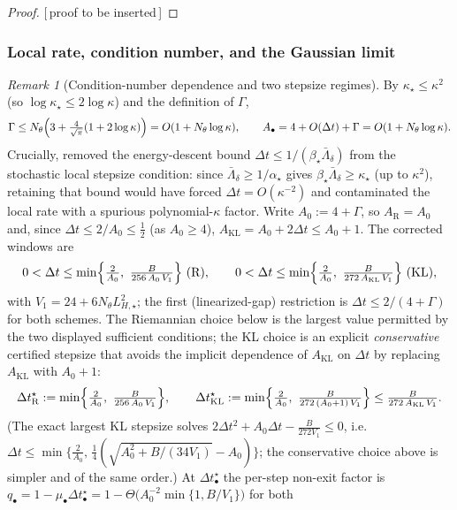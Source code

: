 \documentclass[11pt]{article}
\theoremstyle{plain}
\theoremstyle{definition}
\theoremstyle{remark}
\newtheorem{remark}[remark]{Remark}
\newcommand{\KL}{\mathrm{KL}}
\newcommand{\Riem}{\mathrm{R}}
\newcommand{\LHs}{L_{H,\star}}
\newcommand{\PROOFHOLE}{{\color{red}\textsf{[\,proof to be inserted\,]}}}
\begin{document}
\begin{proof}
\PROOFHOLE
\end{proof}

\subsubsection{Local rate, condition number, and the Gaussian limit}
\label{subsec:local-condnum}

\begin{remark}[Condition-number dependence and two stepsize regimes]
\label{rem:local-condnum}
By $\kappa_\star\leq\kappa^2$ (so $\log\kappa_\star\leq2\log\kappa$) and the definition of $\Gamma$,
\[
    \Gamma\leq N_\theta\Bigl(3+\tfrac4{\sqrt\pi}(1+2\log\kappa)\Bigr)=O(1+N_\theta\log\kappa),
    \qquad A_\bullet=4+O(\Delta t)+\Gamma=O(1+N_\theta\log\kappa).
\]
Crucially,  removed the energy-descent bound
$\Delta t\leq1/(\beta_\star\bar\Lambda_\delta)$ from the stochastic local stepsize condition: since
$\bar\Lambda_\delta\geq1/\alpha_\star$ gives $\beta_\star\bar\Lambda_\delta\geq\kappa_\star$ (up to
$\kappa^2$), retaining that bound would have forced $\Delta t=O(\kappa^{-2})$ and contaminated the
local rate with a spurious polynomial-$\kappa$ factor. Write $A_0:=4+\Gamma$, so $A_{\Riem}=A_0$ and,
since $\Delta t\leq2/A_0\leq\tfrac12$ (as $A_0\geq4$), $A_{\KL}=A_0+2\Delta t\leq A_0+1$. The corrected
windows are
\[
    0<\Delta t\leq\min\Bigl\{\tfrac2{A_0},\ \tfrac{B}{256\,A_0\,V_1}\Bigr\}\ (\Riem),
    \qquad
    0<\Delta t\leq\min\Bigl\{\tfrac2{A_0},\ \tfrac{B}{272\,A_{\KL}\,V_1}\Bigr\}\ (\KL),
\]
with $V_1=24+6N_\theta\LHs^2$; the first (linearized-gap) restriction is $\Delta t\leq2/(4+\Gamma)$ for
both schemes. The Riemannian choice below is the largest value permitted by the two displayed
sufficient conditions; the KL choice is an explicit \emph{conservative} certified stepsize that avoids
the implicit dependence of $A_{\KL}$ on $\Delta t$ by replacing $A_{\KL}$ with $A_0+1$:
\[
    \Delta t_{\Riem}^\star:=\min\Bigl\{\tfrac2{A_0},\ \tfrac{B}{256\,A_0\,V_1}\Bigr\},
    \qquad
    \Delta t_{\KL}^\star:=\min\Bigl\{\tfrac2{A_0},\ \tfrac{B}{272\,(A_0+1)\,V_1}\Bigr\}\leq\tfrac{B}{272\,A_{\KL}\,V_1}.
\]
(The exact largest KL stepsize solves $2\Delta t^2+A_0\Delta t-\tfrac{B}{272V_1}\leq0$, i.e.\
$\Delta t\leq\min\{\tfrac2{A_0},\,\tfrac14(\sqrt{A_0^2+B/(34V_1)}-A_0)\}$; the conservative choice above is
simpler and of the same order.)
At $\Delta t_\bullet^\star$ the per-step non-exit factor is
$q_\bullet=1-\mu_\bullet\Delta t_\bullet^\star=1-\Theta\!\bigl(A_0^{-2}\min\{1,B/V_1\}\bigr)$ for both

\end{remark}
\end{document}
